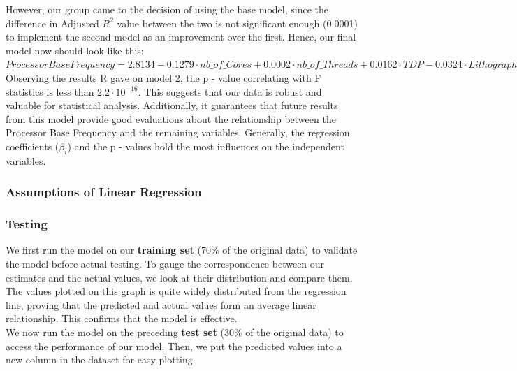 
However, our group came to the decision of using the base model, since the difference in Adjusted $R^2$ value between the two is not significant enough (0.0001) to implement the second model as an improvement over the first. Hence, our final model now should look like this:\\

$Processor Base Frequency = 2.8134 - 0.1279 \cdot nb\_of\_Cores + 0.0002 \cdot nb\_of\_Threads + 0.0162 \cdot TDP - 0.0324 \cdot Lithography$ \\

Observing the results R gave on model 2, the p - value correlating with F statistics is less than $2.2 \cdot 10^{-16}$. This suggests that our data is robust and valuable for statistical analysis. Additionally, it guarantees that future results from this model provide good evaluations about the relationship between the Processor Base Frequency and the remaining variables. Generally, the regression coefficients ($\beta_i$) and the p - values hold the most influences on the independent variables. 

\subsubsection{Assumptions of Linear Regression}


\subsubsection{Testing}
We first run the model on our \textbf{training set} (70\% of the original data) to validate the model before actual testing. To gauge the correspondence between our estimates and the actual values, we look at their distribution and compare them.\\


The values plotted on this graph is quite widely distributed from the regression line, proving that the predicted and actual values form an average linear relationship. This confirms that the model is effective.\\

We now run the model on the preceding \textbf{test set} (30\% of the original data) to access the performance of our model. Then, we put the predicted values into a new column in the dataset for easy plotting.\\

